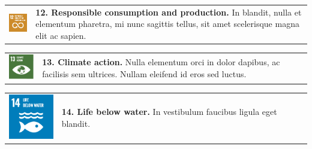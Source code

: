 \begin{multicols}{2}
    \noindent
    \begin{tabular}{p{25mm} p{46mm}}
        \vspace{0mm} \includegraphics[width=2cm]{text/appendix/appendix-sdg/resources/sdg12.pdf} & \vspace{-0.5mm} \textbf{12. Responsible consumption and production.} In blandit, nulla et elementum pharetra, mi nunc sagittis tellus, sit amet scelerisque magna elit ac sapien. \\
    \end{tabular}

    \noindent
    \begin{tabular}{p{25mm} p{46mm}}
        \vspace{0mm} \includegraphics[width=2cm]{text/appendix/appendix-sdg/resources/sdg13.pdf} & \vspace{-0.5mm} \textbf{13. Climate action.} Nulla elementum orci in dolor dapibus, ac facilisis sem ultrices. Nullam eleifend id eros sed luctus.  \\
    \end{tabular}

    \noindent
    \begin{tabular}{p{25mm} p{46mm}}
        \vspace{0mm} \includegraphics[width=2cm]{text/appendix/appendix-sdg/resources/sdg14.pdf} & \vspace{-0.5mm} \textbf{14. Life below water.} In vestibulum faucibus ligula eget blandit.\\
    \end{tabular}

\end{multicols}


    \newpage


